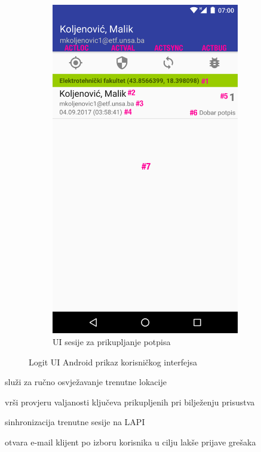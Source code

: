 \begin{figure}[H]
\begin{subfigure}{.5\textwidth}
        \includegraphics[width=0.9\textwidth]{material/03-verified_annot}
        \caption{UI sesije za prikupljanje potpisa}
        \label{img:ui_r}
    \end{subfigure}
    \caption{Logit UI Android prikaz korisničkog interfejsa}%
    \label{fig:ui}
\end{figure}

\begin{description}[noitemsep,align=right,labelwidth=2cm]
    \item [ACTLOC] služi za ručno osvježavanje trenutne lokacije
    \item [ACTVAL] vrši provjeru valjanosti ključeva prikupljenih pri bilježenju prisustva
    \item [ACTSYNC] sinhronizacija trenutne sesije na LAPI
    \item [ACTBUG] otvara e-mail klijent po izboru korisnika u cilju lakše prijave grešaka
\end{description}

